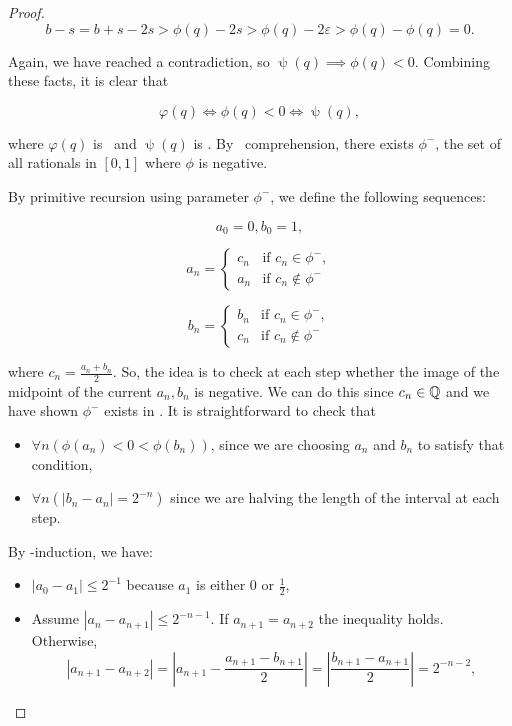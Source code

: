 \documentclass[../main.tex]{memoir}
\begin{document}
\begin{proof}
  \[ b - s = b + s - 2s > \phi(q) - 2s > \phi(q) - 2\varepsilon > \phi(q) - \phi(q) = 0. \]

  Again, we have reached a contradiction, so $\uppsi(q) \implies \phi(q) < 0$. Combining these facts, it is clear that

  \[ \varphi(q) \iff \phi(q) < 0 \iff \uppsi(q), \]

  where $\varphi(q)$ is \re\ and $\uppsi(q)$ is \core. By \rec\ comprehension, there exists $\phi^-$, the set of all rationals in $[0, 1]$ where $\phi$ is negative.

  By primitive recursion using parameter $\phi^-$, we define the following sequences:

  \[ a_0 = 0, b_0 = 1, \]

  \[
    a_n =
    \begin{cases}
      c_n & \text{if } c_n \in \phi^-, \\
      a_n & \text{if } c_n \not\in \phi^-
    \end{cases}
  \]

  \[
    b_n =
    \begin{cases}
      b_n & \text{if } c_n \in \phi^-, \\
      c_n & \text{if } c_n \not\in \phi^-
    \end{cases}
  \]

  where $c_n = \frac{a_n + b_n}{2}$. So, the idea is to check at each step whether the image of the midpoint of the current $a_n, b_n$ is negative. We can do this since $c_n \in \mathbb{Q}$ and we have shown $\phi^-$ exists in \rca. It is straightforward to check that

  \begin{itemize}
  \item $\forall n (\phi(a_n) < 0 < \phi(b_n))$, since we are choosing $a_n$ and $b_n$ to satisfy that condition,
  \item $\forall n (|b_n - a_n| = 2^{-n})$ since we are halving the length of the interval at each step.
  \end{itemize}

  By \re-induction, we have:

  \begin{itemize}
  \item $|a_0 - a_1| \le 2^{-1}$ because $a_1$ is either $0$ or $\frac12$,
  \item Assume $|a_n - a_{n + 1}| \le 2^{-n - 1}$. If $a_{n + 1} = a_{n + 2}$ the inequality holds. Otherwise,
    \[ |a_{n + 1} - a_{n + 2}| = \left\lvert a_{n + 1} - \frac{a_{n + 1} - b_{n + 1}}{2} \right\rvert = \left\lvert \frac{b_{n + 1} - a_{n + 1}}{2} \right\rvert = 2^{-n - 2}, \]
  \end{itemize}


\end{proof}
\end{document}
